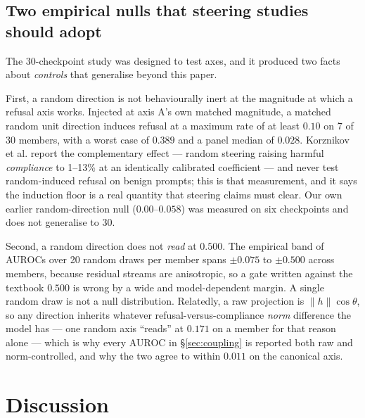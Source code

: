 \documentclass[11pt,letterpaper]{article}
\begin{document}
\subsection{Two empirical nulls that steering studies should adopt}
\label{sec:nulls}

The 30-checkpoint study was designed to test axes, and it produced two facts about \emph{controls} that generalise beyond this paper.

First, a random direction is not behaviourally inert at the magnitude at which a refusal axis works. Injected at axis A's own matched magnitude, a matched random unit direction induces refusal at a maximum rate of at least $0.10$ on 7 of 30 members, with a worst case of $0.389$ and a panel median of $0.028$. Korznikov et al. \citep{Korznikov2025} report the complementary effect --- random steering raising harmful \emph{compliance} to 1--13\% at an identically calibrated coefficient --- and never test random-induced refusal on benign prompts; this is that measurement, and it says the induction floor is a real quantity that steering claims must clear. Our own earlier random-direction null ($0.00$--$0.058$) was measured on six checkpoints and does not generalise to 30.

Second, a random direction does not \emph{read} at $0.500$. The empirical band of AUROCs over 20 random draws per member spans $\pm0.075$ to $\pm0.500$ across members, because residual streams are anisotropic, so a gate written against the textbook $0.500$ is wrong by a wide and model-dependent margin. A single random draw is not a null distribution. Relatedly, a raw projection is $\lVert h\rVert\cos\theta$, so any direction inherits whatever refusal-versus-compliance \emph{norm} difference the model has --- one random axis ``reads'' at $0.171$ on a member for that reason alone --- which is why every AUROC in \S\ref{sec:coupling} is reported both raw and norm-controlled, and why the two agree to within $0.011$ on the canonical axis.

\section{Discussion}
\label{sec:discussion}
\end{document}
